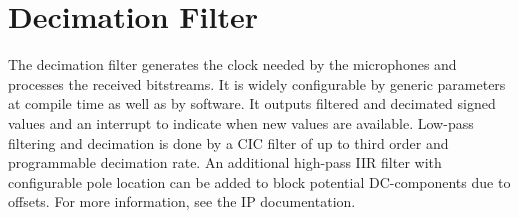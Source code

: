 
\section{Decimation Filter}
\label{sec::filter}

The decimation filter generates the clock needed by the microphones and processes the received bitstreams.
It is widely configurable by generic parameters at compile time as well as by software. 
It outputs filtered and decimated signed values and an interrupt to indicate when new values are available.
Low-pass filtering and decimation is done by a CIC filter of up to third order and programmable decimation rate.
An additional high-pass IIR filter with configurable pole location can be added to block potential DC-components due to offsets.
For more information, see the IP documentation.